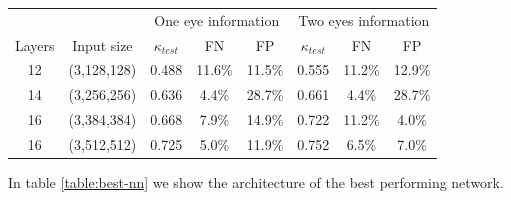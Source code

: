 \documentclass[a0,portrait]{a0poster}
\begin{document}
\begin{multicols}{3}
\begin{center}
	\begin{tabular}{*8c} 
		\hline
		&            & \multicolumn{3}{c}{One eye information} & \multicolumn{3}{c}{Two eyes information} \\
		Layers & Input size & $\kappa_{test}$ & FN & FP & $\kappa_{test}$ & FN & FP \\ [0.5ex] 
		\hline\hline
		12 & (3,128,128) & 0.488 & 11.6\%& 11.5\% & 0.555 & 11.2\%& 12.9\%\\ 
		14 & (3,256,256) & 0.636 & 4.4\%& 28.7\% & 0.661 & 4.4\% & 28.7\% \\ 
		16 & (3,384,384) & 0.668 & 7.9\%& 14.9\% & 0.722 & 11.2\% & 4.0\%  \\ 
		16 & (3,512,512) & 0.725 & 5.0\%& 11.9\% & 0.752 & 6.5\% & 7.0\% \\ 
		\hline
	\end{tabular}
	\label{table-results}
\end{center}

In table \ref{table:best-nn} we show the architecture of the best performing network.


\end{multicols}
\end{document}
